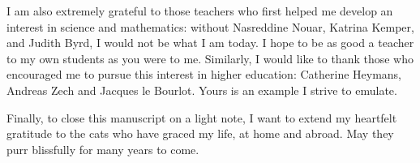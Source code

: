 \pg
I am also extremely grateful to those teachers who first helped me develop an interest in science and mathematics: without Nasreddine Nouar, Katrina Kemper, and Judith Byrd, I would not be what I am today. I hope to be as good a teacher to my own students as you were to me. Similarly, I would like to thank those who encouraged me to pursue this interest in higher education: Catherine Heymans, Andreas Zech and Jacques le Bourlot. Yours is an example I strive to emulate.

\pg
Finally, to close this manuscript on a light note, I want to extend my heartfelt gratitude to the cats who have graced my life, at home and abroad. May they purr blissfully for many years to come.